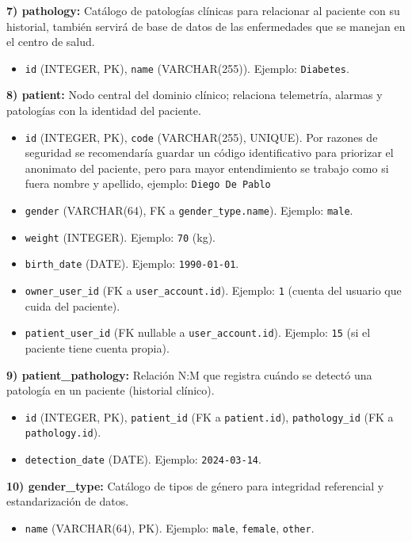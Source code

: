 \documentclass[12pt, a4paper]{article}
\begin{document}
\textbf{7) pathology:} Catálogo de patologías clínicas para relacionar al paciente con su historial, también servirá de base de datos de las enfermedades que se manejan en el centro de salud.
\begin{itemize}
	\item \texttt{id} (INTEGER, PK), \texttt{name} (VARCHAR(255)). Ejemplo: \texttt{Diabetes}.
\end{itemize}


\textbf{8) patient:} Nodo central del dominio clínico; relaciona telemetría, alarmas y patologías con la identidad del paciente.
\begin{itemize}
	\item \texttt{id} (INTEGER, PK), \texttt{code} (VARCHAR(255), UNIQUE). Por razones de seguridad se recomendaría guardar un código identificativo para priorizar el anonimato del paciente, pero para mayor entendimiento se trabajo como si fuera nombre y apellido, ejemplo: \texttt{Diego De Pablo}
	\item \texttt{gender} (VARCHAR(64), FK a \texttt{gender\_type.name}). Ejemplo: \texttt{male}.
	\item \texttt{weight} (INTEGER). Ejemplo: \texttt{70} (kg).
	\item \texttt{birth\_date} (DATE). Ejemplo: \texttt{1990-01-01}.
	\item \texttt{owner\_user\_id} (FK a \texttt{user\_account.id}). Ejemplo: \texttt{1} (cuenta del usuario que cuida del paciente).
	\item \texttt{patient\_user\_id} (FK nullable a \texttt{user\_account.id}). Ejemplo: \texttt{15} (si el paciente tiene cuenta propia).
\end{itemize}



\textbf{9) patient\_pathology:} Relación N:M que registra cuándo se detectó una patología en un paciente (historial clínico).
\begin{itemize}
	\item \texttt{id} (INTEGER, PK), \texttt{patient\_id} (FK a \texttt{patient.id}), \texttt{pathology\_id} (FK a \texttt{pathology.id}).
	\item \texttt{detection\_date} (DATE). Ejemplo: \texttt{2024-03-14}.
\end{itemize}


\textbf{10) gender\_type:} Catálogo de tipos de género para integridad referencial y estandarización de datos.
\begin{itemize}
	\item \texttt{name} (VARCHAR(64), PK). Ejemplo: \texttt{male}, \texttt{female}, \texttt{other}.
\end{itemize}
\end{document}
